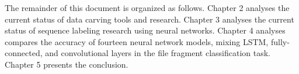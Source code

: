 
The remainder of this document is organized as follows.
    Chapter 2 analyses the current status of data carving tools and research. 
    Chapter 3 analyses the current status of sequence labeling research using neural networks.
    Chapter 4 analyses compares the accuracy of fourteen neural network models, mixing LSTM, fully-connected, and convolutional layers in the file fragment classification task.
    Chapter 5 presents the conclusion.
